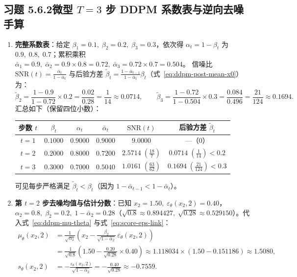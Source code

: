 \subsection*{习题 5.6.2\quad 微型 $T = 3$ 步 DDPM 系数表与逆向去噪手算}
\begin{enumerate}[label=(\alph*), leftmargin=1.8em]
  \item \textbf{完整系数表}：给定 $\beta_1 = 0.1,\; \beta_2 = 0.2,\; \beta_3 = 0.3$，依次得 $\alpha_t = 1 - \beta_t$ 为 $0.9,\; 0.8,\; 0.7$；累积乘积 $\bar{\alpha}_1 = 0.9,\; \bar{\alpha}_2 = 0.9\times 0.8 = 0.72,\; \bar{\alpha}_3 = 0.72\times 0.7 = 0.504$。
  信噪比 $\mathrm{SNR}(t) = \frac{\bar{\alpha}_t}{1-\bar{\alpha}_t}$ 与后验方差 $\tilde{\beta}_t = \frac{1-\bar{\alpha}_{t-1}}{1-\bar{\alpha}_t}\beta_t$（式~\eqref{eq:ddpm-post-mean-x0}）为：
  \[
    \tilde{\beta}_2 = \frac{1 - 0.9}{1 - 0.72}\times 0.2 = \frac{0.02}{0.28} = \frac{1}{14} \approx 0.0714, \qquad
    \tilde{\beta}_3 = \frac{1 - 0.72}{1 - 0.504}\times 0.3 = \frac{0.084}{0.496} = \frac{21}{124} \approx 0.1694.
  \]
  汇总如下（保留四位小数）：
  \begin{center}
  \small
  \begin{tabular}{@{}cccccc@{}}
  \toprule
  步数 $t$ & $\beta_t$ & $\alpha_t$ & $\bar{\alpha}_t$ & $\mathrm{SNR}(t)$ & 后验方差 $\tilde{\beta}_t$ \\
  \midrule
  $t = 1$ & $0.1000$ & $0.9000$ & $0.9000$ & $9.0000$ & ---（$0$） \\
  $t = 2$ & $0.2000$ & $0.8000$ & $0.7200$ & $2.5714\;(\tfrac{18}{7})$ & $0.0714\;(\tfrac{1}{14}) < 0.2$ \\
  $t = 3$ & $0.3000$ & $0.7000$ & $0.5040$ & $1.0161\;(\tfrac{63}{62})$ & $0.1694\;(\tfrac{21}{124}) < 0.3$ \\
  \bottomrule
  \end{tabular}
  \end{center}
  可见每步严格满足 $\tilde{\beta}_t < \beta_t$（因为 $1 - \bar{\alpha}_{t-1} < 1 - \bar{\alpha}_t$）。

  \item \textbf{第 $t = 2$ 步去噪均值与估计分数}：已知 $x_2 = 1.50,\; \varepsilon_\theta(x_2, 2) = 0.40$，$\alpha_2 = 0.8,\; \beta_2 = 0.2,\; 1 - \bar{\alpha}_2 = 0.28$（$\sqrt{0.8} \approx 0.894427,\; \sqrt{0.28} \approx 0.529150$）。代入式~\eqref{eq:ddpm-mu-theta} 与式~\eqref{eq:score-eps-link}：
  \begin{align*}
    \mu_\theta(x_2, 2)
    &= \frac{1}{\sqrt{\alpha_2}}\!\left(x_2 - \frac{\beta_2}{\sqrt{1 - \bar{\alpha}_2}}\,\varepsilon_\theta(x_2, 2)\right) \\
    &= \frac{1}{\sqrt{0.8}}\!\left(1.50 - \frac{0.20}{\sqrt{0.28}}\times 0.40\right)
     \approx 1.118034 \times (1.50 - 0.151186) \approx \mathbf{1.5080}, \\
    s_\theta(x_2, 2)
    &= -\frac{\varepsilon_\theta(x_2, 2)}{\sqrt{1 - \bar{\alpha}_2}}
     = -\frac{0.40}{\sqrt{0.28}} \approx \mathbf{-0.7559}.
  \end{align*}
\end{enumerate}

